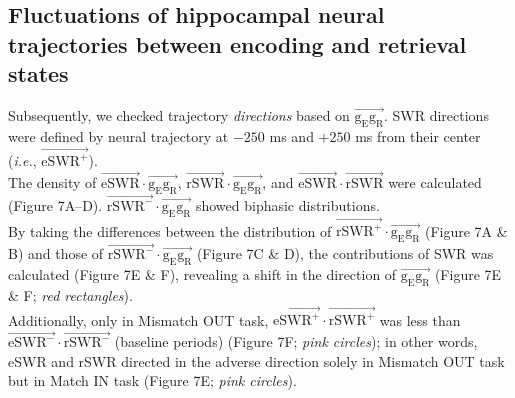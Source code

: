 \documentclass[final,3p,times,twocolumn]{elsarticle}
\begin{document}
\subsection{Fluctuations of hippocampal neural trajectories between encoding and retrieval states}
Subsequently, we checked trajectory \textit{directions} based on $\overrightarrow{\mathrm{g_{E}g_{R}}}$. SWR directions were defined by neural trajectory at $-250$ ms and $+250$ ms from their center (\textit{i.e.}, $\overrightarrow{\mathrm{eSWR^+}}$).
\\
\indent
The density of $\overrightarrow{\mathrm{eSWR}} \cdot \overrightarrow{\mathrm{g_{E}g_{R}}}$, $\overrightarrow{\mathrm{rSWR}} \cdot \overrightarrow{\mathrm{g_{E}g_{R}}}$, and $\overrightarrow{\mathrm{eSWR}} \cdot \overrightarrow{\mathrm{rSWR}}$ were calculated (Figure 7A--D). $\overrightarrow{\mathrm{rSWR^-}} \cdot \overrightarrow{\mathrm{g_{E}g_{R}}}$ showed biphasic distributions.
\\
\indent
By taking the differences between the distribution of $\overrightarrow{\mathrm{rSWR^+}} \cdot \overrightarrow{\mathrm{g_{E}g_{R}}}$ (Figure 7A \& B) and those of $\overrightarrow{\mathrm{rSWR^-}} \cdot \overrightarrow{\mathrm{g_{E}g_{R}}}$ (Figure 7C \& D), the contributions of SWR was calculated (Figure 7E \& F), revealing a shift in the direction of $\overrightarrow{\mathrm{g_{E}g_{R}}}$ (Figure 7E \& F; \textit{red rectangles}).
\\
\indent
Additionally, only in Mismatch OUT task, $\overrightarrow{\mathrm{eSWR^+}} \cdot \overrightarrow{\mathrm{rSWR^+}}$ was less than $\overrightarrow{\mathrm{eSWR^-}} \cdot \overrightarrow{\mathrm{rSWR^-}}$ (baseline periods) (Figure 7F; \textit{pink circles}); in other words, eSWR and rSWR directed in the adverse direction solely in Mismatch OUT task but in Match IN task (Figure 7E; \textit{pink circles}).
\label{sec:results}

\end{document}
